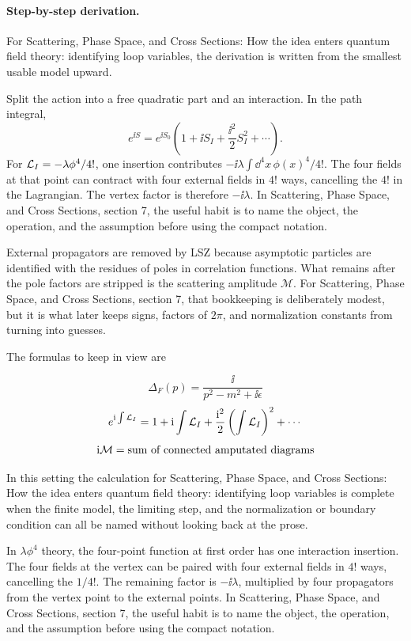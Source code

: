 \paragraph{Step-by-step derivation.}

For Scattering, Phase Space, and Cross Sections: How the idea enters quantum field theory: identifying loop variables, the derivation is written from the smallest usable model upward.

Split the action into a free quadratic part and an interaction.  In the path integral,
\[
  e^{\ii S}=e^{\ii S_0}\left(1+\ii S_I+\frac{\ii^2}{2}S_I^2+\cdots\right).
\]
For \(\mathcal L_I=-\lambda\phi^4/4!\), one insertion contributes \(-\ii\lambda\int\dd^4x\,\phi(x)^4/4!\).  The four fields at that point can contract with four external fields in \(4!\) ways, cancelling the \(4!\) in the Lagrangian.  The vertex factor is therefore \(-\ii\lambda\).  In Scattering, Phase Space, and Cross Sections, section 7, the useful habit is to name the object, the operation, and the assumption before using the compact notation.

External propagators are removed by LSZ because asymptotic particles are identified with the residues of poles in correlation functions.  What remains after the pole factors are stripped is the scattering amplitude \(\mathcal M\).  For Scattering, Phase Space, and Cross Sections, section 7, that bookkeeping is deliberately modest, but it is what later keeps signs, factors of \(2\pi\), and normalization constants from turning into guesses.

The formulas to keep in view are

\[
  \Delta_F(p)=\frac{\ii}{p^2-m^2+\ii\epsilon}
\]
\[
  e^{\mathrm i\int\mathcal L_I}=1+\mathrm i\int\mathcal L_I+\frac{\mathrm i^2}{2}\left(\int\mathcal L_I\right)^2+\cdots
\]
\[
  \mathrm i\mathcal M=\hbox{sum of connected amputated diagrams}
\]

In this setting the calculation for Scattering, Phase Space, and Cross Sections: How the idea enters quantum field theory: identifying loop variables is complete when the finite model, the limiting step, and the normalization or boundary condition can all be named without looking back at the prose.




\begin{example}
In \(\lambda\phi^4\) theory, the four-point function at first order has one interaction insertion.  The four fields at the vertex can be paired with four external fields in \(4!\) ways, cancelling the \(1/4!\).  The remaining factor is \(-\ii\lambda\), multiplied by four propagators from the vertex point to the external points.  In Scattering, Phase Space, and Cross Sections, section 7, the useful habit is to name the object, the operation, and the assumption before using the compact notation.
\end{example}



